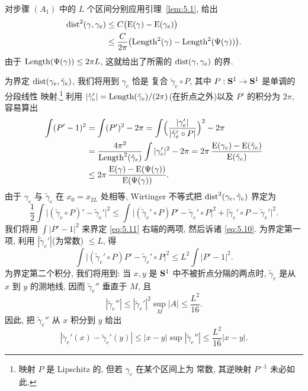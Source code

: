 对步骤 $(A_1)$ 中的 $L$ 个区间分别应用引理~\ref{lem:5.1}, 给出
\begin{equation}
\begin{aligned}
\operatorname{dist}^2(\gamma,\gamma_e)
&\leq C\bigl(\mathrm{E}(\gamma)-\mathrm{E}(\gamma_e)\bigr)\\
&\leq\frac{C}{2\pi}\bigl(\operatorname{Length}^2(\gamma)-\operatorname{Length}^2(\Psi(\gamma))\bigr).
\end{aligned}
\label{eq:5.9}
\end{equation}
由于 $\operatorname{Length}(\Psi(\gamma))\leq 2\pi L$, 这就给出了所需的
$\operatorname{dist}(\gamma,\gamma_e)$ 的界.

为界定 $\operatorname{dist}(\gamma_e,\tilde{\gamma}_e)$, 我们将用到 $\gamma_e$ 恰是
复合 $\tilde{\gamma}_e\circ P$, 其中 $P:\mathbf{S}^1\to\mathbf{S}^1$ 是单调的分段线性
映射.\footnote{映射 $P$ 是 Lipschitz 的, 但若 $\gamma_e$ 在某个区间上为
常数, 其逆映射 $P^{-1}$ 未必如此.} 利用
$|\tilde{\gamma}_e'|=\operatorname{Length}(\tilde{\gamma}_e)/(2\pi)$(在折点之外)以及
$P'$ 的积分为 $2\pi$, 容易算出
\begin{equation}
\begin{aligned}
\int(P'-1)^2
&=\int(P')^2-2\pi=\int\Bigl(\frac{|\gamma_e'|}
{|\tilde{\gamma}_e'\circ P|}\Bigr)^2-2\pi\\
&=\frac{4\pi^2}{\operatorname{Length}^2(\tilde{\gamma}_e)}\int|\gamma_e'|^2-2\pi
 =2\pi\,\frac{\mathrm{E}(\gamma_e)-\mathrm{E}(\tilde{\gamma}_e)}
{\mathrm{E}(\tilde{\gamma}_e)}\\
&\leq 2\pi\,\frac{\mathrm{E}(\gamma)-\mathrm{E}(\Psi(\gamma))}
{\mathrm{E}(\Psi(\gamma))}.
\end{aligned}
\label{eq:5.10}
\end{equation}
由于 $\gamma_e$ 与 $\tilde{\gamma}_e$ 在 $x_0=x_{2L}$ 处相等, Wirtinger
不等式把 $\operatorname{dist}^2(\gamma_e,\tilde{\gamma}_e)$ 界定为
\begin{equation}
\frac12\int\bigl|(\tilde{\gamma}_e\circ P)'-\tilde{\gamma}_e'\bigr|^2
\leq\int\bigl|(\tilde{\gamma}_e'\circ P)P'-\tilde{\gamma}_e'\circ P\bigr|^2
+\bigl|\tilde{\gamma}_e'\circ P-\tilde{\gamma}_e'\bigr|^2.
\label{eq:5.11}
\end{equation}
我们将用 $\int|P'-1|^2$ 来界定 \eqref{eq:5.11} 右端的两项, 然后诉诸
\eqref{eq:5.10}. 为界定第一项, 利用 $|\tilde{\gamma}_e'|$(为常数)
$\leq L$, 得
\begin{equation}
\int\bigl|(\tilde{\gamma}_e'\circ P)P'-\tilde{\gamma}_e'\circ P\bigr|^2
\leq L^2\int|P'-1|^2.
\label{eq:5.12}
\end{equation}
为界定第二个积分, 我们将用到: 当 $x,y$ 是 $\mathbf{S}^1$ 中不被折点分隔的两点时,
$\tilde{\gamma}_e$ 是从 $x$ 到 $y$ 的测地线, 因而 $\tilde{\gamma}_e''$
垂直于 $M$, 且
\begin{equation*}
|\tilde{\gamma}_e''|\leq|\tilde{\gamma}_e'|^2\sup_M|A|\leq\frac{L^2}{16}.
\end{equation*}
因此, 把 $\tilde{\gamma}_e''$ 从 $x$ 积分到 $y$ 给出
\begin{equation}
|\tilde{\gamma}_e'(x)-\tilde{\gamma}_e'(y)|
\leq|x-y|\sup|\tilde{\gamma}_e''|\leq\frac{L^2}{16}|x-y|.
\label{eq:5.13}
\end{equation}

